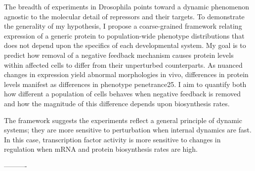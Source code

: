 The breadth of experiments in Drosophila points toward a dynamic phenomenon agnostic to the molecular detail of repressors and their targets. To demonstrate the generality of my hypothesis, I propose a coarse-grained framework relating expression of a generic protein to population-wide phenotype distributions that does not depend upon the specifics of each developmental system. My goal is to predict how removal of a negative feedback mechanism causes protein levels within affected cells to differ from their unperturbed counterparts. As nuanced changes in expression yield abnormal morphologies in vivo, differences in protein levels manifest as differences in phenotype penetrance25. I aim to quantify both how different a population of cells behaves when negative feedback is removed and how the magnitude of this difference depends upon biosynthesis rates.

The framework suggests the experiments reflect a general principle of dynamic systems; they are more sensitive to perturbation when internal dynamics are fast. In this case, transcription factor activity is more sensitive to changes in regulation when mRNA and protein biosynthesis rates are high.

----------


